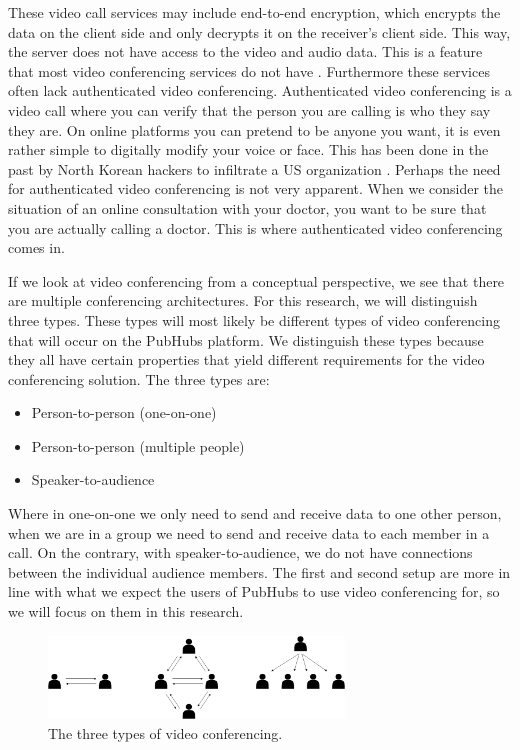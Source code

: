 \documentclass{report}
\begin{document}
These video call services may include end-to-end encryption, which encrypts the data on the client side and only
decrypts it on the receiver's client side. This way, the server does not have access to the video and audio data. This
is a feature that most video conferencing services do not have \cite{gauthier_dynamic_2021}. Furthermore these
services often lack authenticated video conferencing. Authenticated video conferencing is a video
call where you can verify that the person you are calling is who they say they are.
On online platforms you can pretend to be anyone you want, it is even rather simple to digitally
modify your voice or face. This has been done in the past by North Korean hackers to infiltrate a US organization \cite{
noauthor_how_nodate}. Perhaps the need for authenticated video conferencing is not very apparent. When we consider
the situation of an online consultation with your doctor, you want to be sure that you are actually calling a doctor. This is
where authenticated video conferencing comes in.

If we look at video conferencing from a conceptual perspective, we see that there are multiple conferencing
architectures. For this research, we will distinguish three types. These types will most likely be different types
of video conferencing that will occur on the PubHubs platform. We distinguish these types because
they all have certain properties that yield different requirements for the video conferencing solution. The three
types are:

\begin{itemize}
    \item Person-to-person (one-on-one)
    \item Person-to-person (multiple people)
    \item Speaker-to-audience
\end{itemize}

Where in one-on-one we only need to send and receive data to one other person, when we are in a
group we need to send and receive data to each member in a call. On the contrary, with speaker-to-audience, we do
not have connections between the individual audience members. The first and second setup are more in line with what
we expect the users of PubHubs to use video conferencing for, so we will focus on them in this research.

\begin{figure}[!hbt]
\centering
\includegraphics[width=0.7\textwidth]{img/three-types}
\caption{The three types of video conferencing.}
\label{fig:three-types-video-conferencing}
\end{figure}
\end{document}
